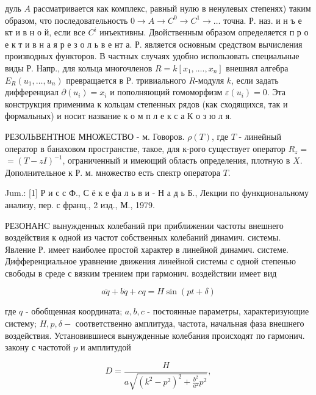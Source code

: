 \documentclass[10pt]{article}
\begin{document}
дуль $A$ рассматривается как комплекс, равный нулю в ненулевых степенях) таким образом, что последовательность $0 \rightarrow A \rightarrow C^{0} \rightarrow C^{1} \rightarrow \ldots$ точна. Р. наз. и н ъ е кт и в н о й, если все $C^{i}$ инъективны. Двойственным образом определяется п р о е к т и в н а я р е з о л ь в е нт а. Р. является основным средством вычисления производных функторов. В частных случаях удобно использовать специальные виды Р. Напр., для кольца многочленов $R=k\left[x_{1}, \ldots ., x_{n}\right]$ внешнял алгебра $E_{R}\left(u_{1}, \ldots, u_{n}\right)$ превращается в Р. тривиального $R$-модуля $k$, если задать дифференциал $\partial\left(u_{i}\right)=x_{i}$ и пополняющий гомоморфизм $\varepsilon\left(u_{i}\right)=0$. Эта конструкция применима к кольцам степенных рядов (как сходящихся, так и формальных) и носит название к о м п л е к с а К о з ю л я.



РЕЗОЛЬВЕНТНОЕ МНОЖЕСТВО - м. Говоров. $\rho(T)$, где $T$ - линейный оператор в банаховом пространстве, такое, для к-рого существует оператор $R_{z}=$ $=(T-z I)^{-1}$, ограниченный и имеющий область определения, плотную в $X$. Дополнительное к Р. м. множество есть спектр оператора $T$.



Jum.: [1] Р и с с Ф., С ё к е фа л ь в и - Н а д ь Б., Лекции по функциональному анализу, пер. с франц., 2 изд., М., 1979.



РЕ3ОНАНC вынужденных колебаний при приближении частоты внешнего воздействия к одной из частот собственных колебаний динамич. системы. Явление Р. имеет наиболее простой характер в линейной динамич. системе. Дифференциальное уравнение движения линейной системы с одной степенью свободы в среде с вязким трением при гармонич. воздействии имеет вид



\[

a \ddot{q}+b \dot{q}+c q=H \sin (p t+\delta)

\]



где $q$ - обобщенная координата; $a, b, c$ - постоянные параметры, характеризующие систему; $H, p, \delta-$ соответственно амплитуда, частота, начальная фаза внешнего воздействия. Установившиеся вынужденные колебания происходят по гармонич. закону с частотой $p$ и амплитудой



\[

D=\frac{H}{a \sqrt{\left(k^{2}-p^{2}\right)^{2}+\frac{b^{2}}{a^{2}} p^{2}}},

\]
\end{document}

